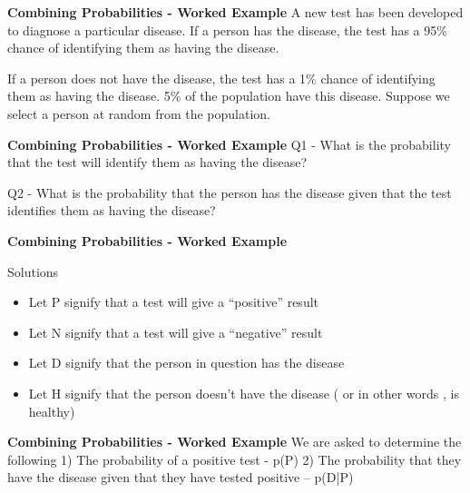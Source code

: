 \documentclass[IntroMain.tex]{subfiles}
\begin{document}
\begin{frame}
	\textbf{Combining Probabilities - Worked Example}
A new test has been developed to diagnose a particular disease. If a person has the disease, the test has a 95\% chance of identifying them as having the disease. 

If a person does not have the disease, the test has a 1\% chance of identifying them as having the disease. 5\% of the population have this disease. Suppose we select a person at random from the population.
\end{frame}
\begin{frame}
	\textbf{Combining Probabilities - Worked Example}
Q1 - What is the probability that the test will identify them as having the disease?

Q2 - What is the probability that the person has the disease given that the test identifies them as having the disease?

\end{frame}
\begin{frame}
	\textbf{Combining Probabilities - Worked Example}
						
Solutions 
\begin{itemize}
\item	Let P signify that a test will give a “positive” result 
\item	Let N signify that a test will give a “negative” result	
\item	Let D signify that the person in question has the disease
\item	Let H signify that the person doesn’t have the disease ( or in other words , is healthy) 
\end{itemize}
\end{frame}
\begin{frame}
	\textbf{Combining Probabilities - Worked Example}
We are asked to determine the following 
1) The probability of a positive test - p(P)
2) The probability that they have the disease given that they have tested positive – p(D|P)
	
\end{frame}
\end{document}
